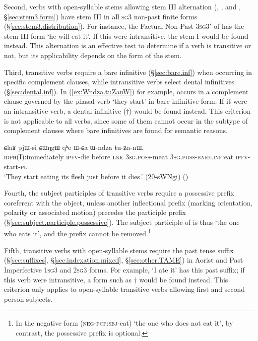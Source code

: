 Second, verbs with open-syllable stems allowing stem III alternation (, ,  and , §\ref{sec:stem3.form}) have stem III in all \textsc{sg}\fl{}3 non-past finite forms  (§\ref{sec:stem3.distribution}). For instance, the Factual Non-Past 3\textsc{sg}\fl{}3$'$ of  has the stem III form  `he will eat it'. If this were intransitive, the stem I  would be found instead. This alternation is an effective test to determine if a verb is transitive or not, but its applicability depends on the form of the stem.

Third, transitive verbs require a bare infinitive (§\ref{sec:bare.inf}) when occurring in specific complement clauses, while intransitive verbs select dental infinitives (§\ref{sec:dental.inf}). In (\ref{ex:Wndza.tuZanW}) for example,  occurs in a complement clause governed by the phasal verb  `they start' in bare infinitive form. If it were an intransitive verb, a dental infinitive ($\dagger$) would be found instead. This criterion is not applicable to all verbs, since some of them cannot occur in the subtype of complement clauses where bare infinitives are found for semantic reasons.

\begin{exe}
\ex   \label{ex:Wndza.tuZanW}
\gll  ɕlaʁ pjɯ-si ɕɯŋgɯ qʰe ɯ-ɕa ɯ-ndza tu-ʑa-nɯ. \\
\textsc{idph}(I):immediately \textsc{ipfv}-die before \textsc{lnk} \textsc{3sg}.\textsc{poss}-meat \textsc{3sg}.\textsc{poss}-\textsc{bare}.\textsc{inf}:eat \textsc{ipfv}-start-\textsc{pl} \\
\glt `They start eating its flesh just before it dies.' (20-sWNgi)
()
\end{exe}

Fourth, the subject participles of transitive verbs require a possessive prefix coreferent with the object, unless another inflectional prefix (marking orientation, polarity or associated motion) precedes the participle prefix   (§\ref{sec:subject.participle.possessive}). The subject participle of  is thus  `the one who eats it', and the prefix  cannot be removed.\footnote{In the negative form  (\textsc{neg}-\textsc{pcp}:\textsc{sbj}-eat) `the one who does not eat it', by contrast, the possessive prefix  is optional.}

Fifth, transitive verbs with open-syllable stems require the past tense  suffix (§\ref{sec:suffixes}, §\ref{sec:indexation.mixed}, §\ref{sec:other.TAME}) in Aorist and Past Imperfective \textsc{1sg}\fl{}3 and \textsc{2sg}\fl{}3 forms. For example,  `I ate it' has this past suffix; if this verb were intransitive, a form such as $\dagger$ would be found instead. This criterion only applies to open-syllable transitive verbs allowing first and second person subjects.

